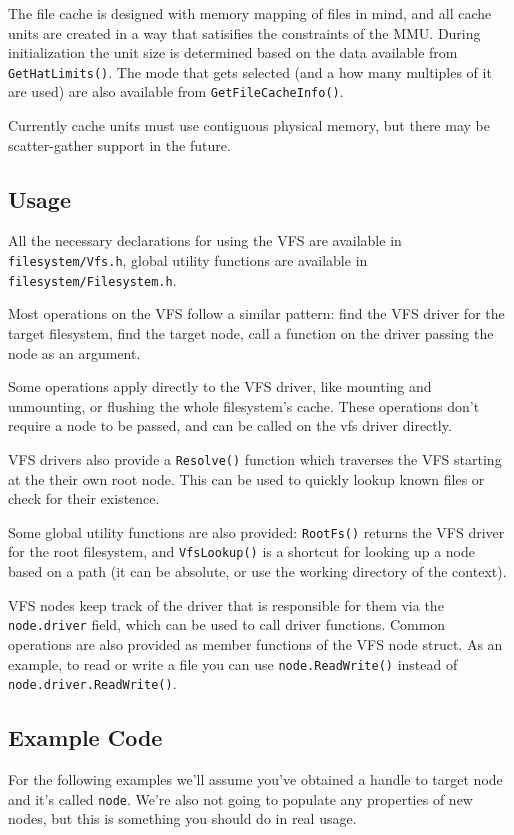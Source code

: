 The file cache is designed with memory mapping of files in mind, and all cache units are created in a way that satisifies the constraints of the MMU. During initialization the unit size is determined based on the data available from \verb|GetHatLimits()|. The mode that gets selected (and a how many multiples of it are used) are also available from \verb|GetFileCacheInfo()|.

Currently cache units must use contiguous physical memory, but there may be scatter-gather support in the future.

\subsection{Usage}
All the necessary declarations for using the VFS are available in \verb|filesystem/Vfs.h|, global utility functions are available in \verb|filesystem/Filesystem.h|.

Most operations on the VFS follow a similar pattern: find the VFS driver for the target filesystem, find the target node, call a function on the driver passing the node as an argument.

Some operations apply directly to the VFS driver, like mounting and unmounting, or flushing the whole filesystem's cache. These operations don't require a node to be passed, and can be called on the vfs driver directly.

VFS drivers also provide a \verb|Resolve()| function which traverses the VFS starting at the their own root node. This can be used to quickly lookup known files or check for their existence.

Some global utility functions are also provided: \verb|RootFs()| returns the VFS driver for the root filesystem, and \verb|VfsLookup()| is a shortcut for looking up a node based on a path (it can be absolute, or use the working directory of the context).

VFS nodes keep track of the driver that is responsible for them via the \verb|node.driver| field, which can be used to call driver functions. Common operations are also provided as member functions of the VFS node struct. As an example, to read or write a file you can use \verb|node.ReadWrite()| instead of \verb|node.driver.ReadWrite()|.

\subsection{Example Code}
For the following examples we'll assume you've obtained a handle to target node and it's called \verb|node|. We're also not going to populate any properties of new nodes, but this is something you should do in real usage.

